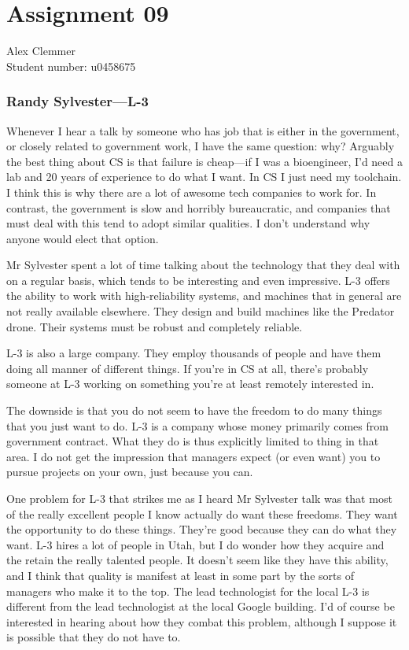 \documentclass[a4paper]{article}
\begin{document}
\section*{Assignment 09}
Alex Clemmer \\
Student number: u0458675

\subsubsection*{Randy Sylvester---L-3}

Whenever I hear a talk by someone who has job that is either in the government, or closely related to government work, I have the same question: why? Arguably the best thing about CS is that failure is cheap---if I was a bioengineer, I'd need a lab and 20 years of experience to do what I want. In CS I just need my toolchain. I think this is why there are a lot of awesome tech companies to work for. In contrast, the government is slow and horribly bureaucratic, and companies that must deal with this tend to adopt similar qualities. I don't understand why anyone would elect that option.

Mr Sylvester spent a lot of time talking about the technology that they deal with on a regular basis, which tends to be interesting and even impressive. L-3 offers the ability to work with high-reliability systems, and machines that in general are not really available elsewhere. They design and build machines like the Predator drone. Their systems must be robust and completely reliable.

L-3 is also a large company. They employ thousands of people and have them doing all manner of different things. If you're in CS at all, there's probably someone at L-3 working on something you're at least remotely interested in.

The downside is that you do not seem to have the freedom to do many things that you just want to do. L-3 is a company whose money primarily comes from government contract. What they do is thus explicitly limited to thing in that area. I do not get the impression that managers expect (or even want) you to pursue projects on your own, just because you can.

One problem for L-3 that strikes me as I heard Mr Sylvester talk was that most of the really excellent people I know actually do want these freedoms. They want the opportunity to do these things. They're good because they can do what they want. L-3 hires a lot of people in Utah, but I do wonder how they acquire and the retain the really talented people. It doesn't seem like they have this ability, and I think that quality is manifest at least in some part by the sorts of managers who make it to the top. The lead technologist for the local L-3 is different from the lead technologist at the local Google building. I'd of course be interested in hearing about how they combat this problem, although I suppose it is possible that they do not have to.
\end{document}
